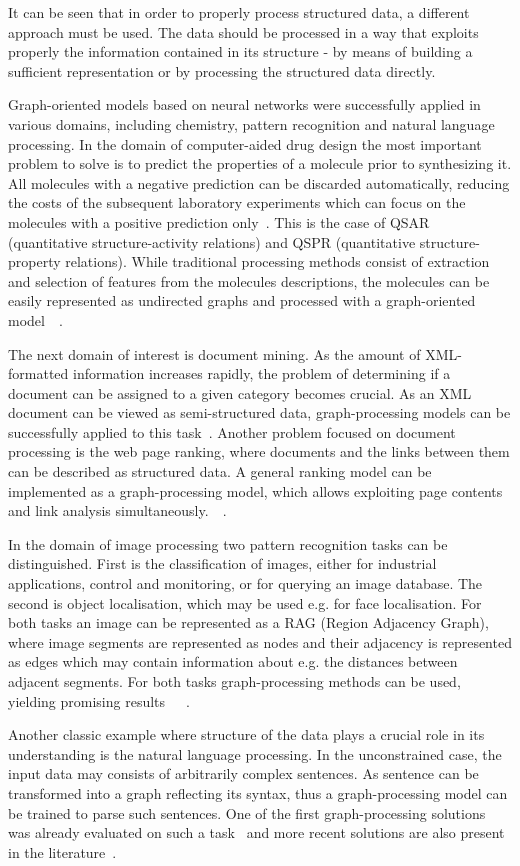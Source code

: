It can be seen that in order to properly process structured data, a different approach must be used. The data should be processed in a way that exploits properly the information contained in its structure - by means of building a sufficient representation or by processing the structured data directly. 

Graph-oriented models based on neural networks were successfully applied in various domains, including chemistry, pattern recognition and natural language processing. In the domain of computer-aided drug design the most important problem to solve is to predict the properties of a molecule prior to synthesizing it. All molecules with a negative prediction can be discarded automatically, reducing the costs of the subsequent laboratory experiments which can focus on the molecules with a positive prediction only~\cite{goulon2005hopfield}. This is the case of QSAR (quantitative structure-activity relations) and QSPR (quantitative structure-property relations). While traditional processing methods consist of extraction and selection of features from the molecules descriptions, the molecules can be easily represented as undirected graphs and processed with a graph-oriented model~\cite{goulon2007predicting}~\cite{goulon2005learning}.

The next domain of interest is document mining. As the amount of XML-formatted information increases rapidly, the problem of determining if a document can be assigned to a given category becomes crucial. As an XML document can be viewed as semi-structured data, graph-processing models can be successfully applied to this task~\cite{yong2006xml}. Another problem focused on document processing is the web page ranking, where documents and the links between them can be described as structured data. A general ranking model can be implemented as a graph-processing model, which allows exploiting page contents and link analysis simultaneously.~\cite{scarselli2005graph}~\cite{scarselli2009graph}.

In the domain of image processing two pattern recognition tasks can be distinguished. First is the classification of images, either for industrial applications, control and monitoring, or for querying an image database. The second is object localisation, which may be used e.g. for face localisation. For both tasks an image can be represented as a RAG (Region Adjacency Graph), where image segments are represented as nodes and their adjacency is represented as edges which may contain information about e.g. the distances between adjacent segments. For both tasks graph-processing methods can be used, yielding promising results~\cite{monfardini2006graph}~\cite{bianchini2005recursive}~\cite{quek2011structural}.

Another classic example where structure of the data plays a crucial role in its understanding is the natural language processing. In the unconstrained case, the input data may consists of arbitrarily complex sentences. As sentence can be transformed into a graph reflecting its syntax, thus a graph-processing model can be trained to parse such sentences. One of the first graph-processing solutions was already evaluated on such a task~\cite{pollack1990recursive} and more recent solutions are also present in the literature~\cite{costa2003towards}. 
